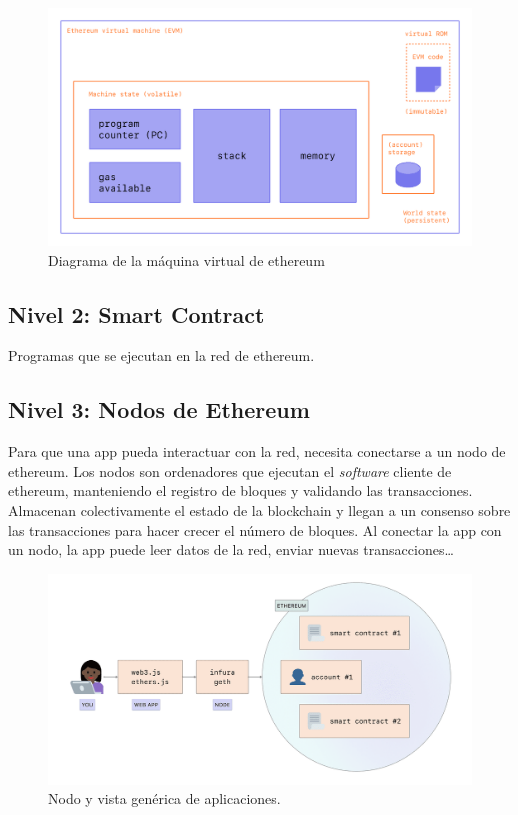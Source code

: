 \begin{figure}[h!]
  \centering
  \includegraphics[width=0.6\linewidth]{figs/EstadoArte/Ethereum/evm}
  \caption[Diagrama EVM]{Diagrama de la máquina virtual de ethereum}
  \label{fig:evm}
\end{figure}

\subsection{Nivel 2: Smart Contract} 

Programas que se ejecutan en la red de ethereum. 

\subsection{Nivel 3: Nodos de Ethereum}

Para que una app pueda interactuar con la red, necesita conectarse a un nodo de ethereum. Los nodos son ordenadores que ejecutan el \emph{software} cliente de ethereum, manteniendo el registro de bloques y validando las transacciones. Almacenan colectivamente el estado de la blockchain y llegan a un consenso sobre las transacciones para hacer crecer el número de bloques. Al conectar la app con un nodo, la app puede leer datos de la red, enviar nuevas transacciones\dots

\begin{figure}[h!]
  \centering
  \includegraphics[width=0.6\linewidth]{figs/EstadoArte/Ethereum/ethereumNodo}
  \caption[Nodos vista genérica]{Nodo y vista genérica de aplicaciones.}
  \label{fig:etherNodo}
\end{figure}

